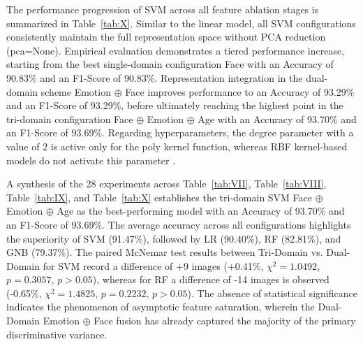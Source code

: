 The performance progression of SVM across all feature ablation stages is summarized in Table~\ref{tab:X}. Similar to the linear model, all SVM configurations consistently maintain the full representation space without PCA reduction (pca=None). Empirical evaluation demonstrates a tiered performance increase, starting from the best single-domain configuration Face with an Accuracy of 90.83\% and an F1-Score of 90.83\%. Representation integration in the dual-domain scheme Emotion $\oplus$ Face improves performance to an Accuracy of 93.29\% and an F1-Score of 93.29\%, before ultimately reaching the highest point in the tri-domain configuration Face $\oplus$ Emotion $\oplus$ Age with an Accuracy of 93.70\% and an F1-Score of 93.69\%. Regarding hyperparameters, the degree parameter with a value of 2 is active only for the poly kernel function, whereas RBF kernel-based models do not activate this parameter \cite{ref51}.

A synthesis of the 28 experiments across Table~\ref{tab:VII}, Table~\ref{tab:VIII}, Table~\ref{tab:IX}, and Table~\ref{tab:X} establishes the tri-domain SVM Face $\oplus$ Emotion $\oplus$ Age as the best-performing model with an Accuracy of 93.70\% and an F1-Score of 93.69\%. The average accuracy across all configurations highlights the superiority of SVM (91.47\%), followed by LR (90.40\%), RF (82.81\%), and GNB (79.37\%). The paired McNemar test results between Tri-Domain vs. Dual-Domain for SVM record a difference of +9 images (+0.41\%, $\chi^2 = 1.0492$, $p = 0.3057$, $p > 0.05$), whereas for RF a difference of -14 images is observed (-0.65\%, $\chi^2 = 1.4825$, $p = 0.2232$, $p > 0.05$). The absence of statistical significance indicates the phenomenon of asymptotic feature saturation, wherein the Dual-Domain Emotion $\oplus$ Face fusion has already captured the majority of the primary discriminative variance.
